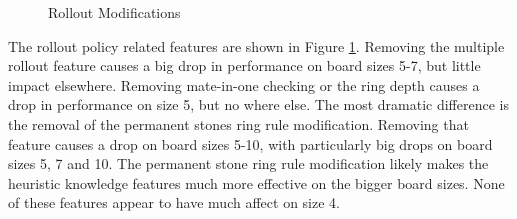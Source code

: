 \begin{figure}
	\centering
{}
	\caption{Rollout Modifications}
	\label{fig:comborollout}
\end{figure}


The rollout policy related features are shown in Figure \ref{fig:comborollout}. Removing the multiple rollout feature causes a big drop in performance on board sizes 5-7, but little impact elsewhere. Removing mate-in-one checking or the ring depth causes a drop in performance on size 5, but no where else. The most dramatic difference is the removal of the permanent stones ring rule modification. Removing that feature causes a drop on board sizes 5-10, with particularly big drops on board sizes 5, 7 and 10. The permanent stone ring rule modification likely makes the heuristic knowledge features much more effective on the bigger board sizes. None of these features appear to have much affect on size 4.


